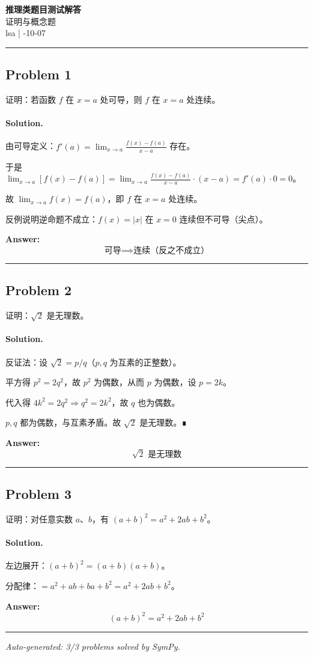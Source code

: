 \documentclass[12pt, a4paper]{ctexart}
\newcommand{\problem}[1]{\subsection*{Problem #1}}
\newcommand{\solution}{\paragraph{Solution.}}
\begin{document}
\begin{center}
    {\LARGE\bfseries 推理类题目测试解答} \\[0.5em]
    {\large 证明与概念题} \\[0.3em]
    lsa \quad | -10-07
\end{center}

\hrule
\vspace{1em}
\problem{1}

证明：若函数 $f$ 在 $x=a$ 处可导，则 $f$ 在 $x=a$ 处连续。

\solution

由可导定义：$f'(a) = \lim_{x\to a}\frac{f(x)-f(a)}{x-a}$ 存在。

于是 $\lim_{x\to a}[f(x)-f(a)] = \lim_{x\to a}\frac{f(x)-f(a)}{x-a}\cdot(x-a) = f'(a)\cdot 0 = 0$。

故 $\lim_{x\to a}f(x)=f(a)$，即 $f$ 在 $x=a$ 处连续。

反例说明逆命题不成立：$f(x)=|x|$ 在 $x=0$ 连续但不可导（尖点）。

\textbf{Answer:}
\[\boxed{\text{可导} \implies \text{连续（反之不成立）}}\]

\vspace{1em}
\hrule
\vspace{1em}

\problem{2}

证明：$\sqrt{2}$ 是无理数。

\solution

反证法：设 $\sqrt{2}=p/q$（$p,q$ 为互素的正整数）。

平方得 $p^2 = 2q^2$，故 $p^2$ 为偶数，从而 $p$ 为偶数，设 $p=2k$。

代入得 $4k^2 = 2q^2 \Rightarrow q^2 = 2k^2$，故 $q$ 也为偶数。

$p,q$ 都为偶数，与互素矛盾。故 $\sqrt{2}$ 是无理数。∎

\textbf{Answer:}
\[\boxed{\sqrt{2} \text{ 是无理数}}\]

\vspace{1em}
\hrule
\vspace{1em}

\problem{3}

证明：对任意实数 $a$、$b$，有 $(a+b)^2 = a^2 + 2ab + b^2$。

\solution

左边展开：$(a+b)^2 = (a+b)(a+b)$。

分配律：$= a^2 + ab + ba + b^2 = a^2 + 2ab + b^2$。

\textbf{Answer:}
\[\boxed{(a+b)^2 = a^2 + 2ab + b^2}\]

\vspace{1em}
\hrule
\vspace{1em}


\vspace{2em}
\noindent\textit{Auto-generated: 3/3 problems solved by SymPy.}
\end{document}
